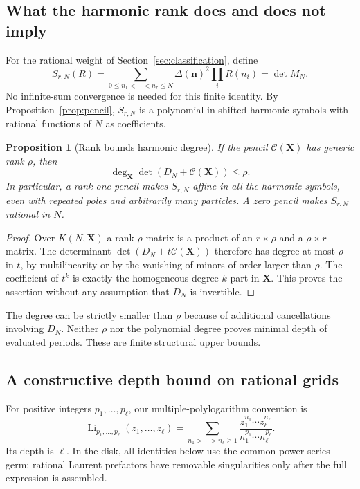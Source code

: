 \documentclass[11pt,letterpaper]{article}
\numberwithin{equation}{section}
\newtheorem{proposition}[theorem]{Proposition}
\theoremstyle{definition}\newtheorem{definition}[theorem]{Definition}
\theoremstyle{remark}\newtheorem{remark}[theorem]{Remark}
\DeclareMathOperator{\Li}{Li}
\begin{document}
\subsection{What the harmonic rank does and does not imply}
For the rational weight of Section~\ref{sec:classification}, define
\[
 S_{r,N}(R)=\sum_{0\le n_1<\cdots<n_r\le N}
             \Delta(\bm n)^2\prod_iR(n_i)=\det M_N.
\]
No infinite-sum convergence is needed for this finite identity.
By Proposition~\ref{prop:pencil}, $S_{r,N}$ is a polynomial in
shifted harmonic symbols with rational functions of $N$ as coefficients.

\begin{proposition}[Rank bounds harmonic degree]\label{prop:degree}
If the pencil $\mathscr C(\bm X)$ has generic rank $\rho$, then
\begin{equation}\label{eq:degree-bound}
 \deg_{\bm X}\det(D_N+\mathscr C(\bm X))\le\rho.
\end{equation}
In particular, a rank-one pencil makes $S_{r,N}$ affine in all the
harmonic symbols, even with repeated poles and arbitrarily many particles.
A zero pencil makes $S_{r,N}$ rational in $N$.
\end{proposition}
\begin{proof}
Over $K(N,\bm X)$ a rank-$\rho$ matrix is a product of an $r\times\rho$
and a $\rho\times r$ matrix. The determinant
$\det(D_N+t\mathscr C(\bm X))$ therefore has degree at most $\rho$
in $t$, by multilinearity or by the vanishing of minors of order
larger than $\rho$. The coefficient of $t^k$ is exactly the
homogeneous degree-$k$ part in $\bm X$. This proves the assertion
without any assumption that $D_N$ is invertible.
\end{proof}

The degree can be strictly smaller than $\rho$ because of additional
cancellations involving $D_N$. Neither $\rho$ nor the polynomial degree
proves minimal depth of evaluated periods. These are finite structural
upper bounds.

\subsection{A constructive depth bound on rational grids}
For positive integers $p_1,\ldots,p_\ell$, our multiple-polylogarithm
convention is
\begin{equation}\label{eq:MPL}
 \Li_{p_1,\ldots,p_\ell}(z_1,\ldots,z_\ell)
 =\sum_{n_1>\cdots>n_\ell\ge1}
   \frac{z_1^{n_1}\cdots z_\ell^{n_\ell}}
        {n_1^{p_1}\cdots n_\ell^{p_\ell}}.
\end{equation}
Its depth is $\ell$. In the disk, all identities below use the
common power-series germ; rational Laurent prefactors have removable
singularities only after the full expression is assembled.
\end{document}
